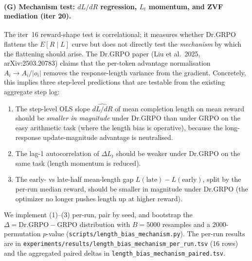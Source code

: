 \paragraph{(G) Mechanism test: $dL/dR$ regression, $L_t$ momentum, and ZVF mediation (iter 20).}
The iter~16 reward-shape test is correlational; it measures whether Dr.GRPO
flattens the $E[R\mid L]$ curve but does not directly test the
\emph{mechanism} by which the flattening should arise. The Dr.GRPO paper
(Liu et al.\ 2025, arXiv:2503.20783) claims that the per-token advantage
normalisation $A_i \to A_i / |o_i|$ removes the response-length variance
from the gradient. Concretely, this implies three step-level predictions
that are testable from the existing aggregate step log:
\begin{enumerate}
\item The step-level OLS slope $\widehat{dL/dR}$ of mean completion
  length on mean reward should be \emph{smaller in magnitude} under
  Dr.GRPO than under GRPO on the easy arithmetic task (where the length
  bias is operative), because the long-response update-magnitude
  advantage is neutralised.
\item The lag-1 autocorrelation of $\Delta L_t$ should be weaker under
  Dr.GRPO on the same task (length momentum is reduced).
\item The early- vs late-half mean-length gap $L(\text{late}) - L(\text{early})$,
  split by the per-run median reward, should be smaller in magnitude
  under Dr.GRPO (the optimizer no longer pushes length up at higher reward).
\end{enumerate}
We implement (1)--(3) per-run, pair by seed, and bootstrap the
$\Delta = \text{Dr.GRPO} - \text{GRPO}$ distribution with $B{=}5000$
resamples and a $2000$-permutation $p$-value
(\texttt{scripts/length\_bias\_mechanism.py}). The per-run results are
in \texttt{experiments/results/length\_bias\_mechanism\_per\_run.tsv}
(16 rows) and the aggregated paired deltas in
\texttt{length\_bias\_mechanism\_paired.tsv}.

